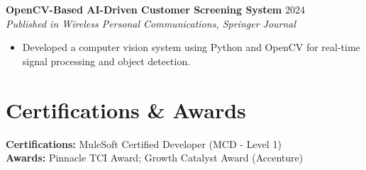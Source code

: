 \documentclass[letterpaper,10pt]{article}
\begin{document}
\textbf{OpenCV-Based AI-Driven Customer Screening System} \hfill 2024 \\
\textit{Published in Wireless Personal Communications, Springer Journal}
\begin{itemize}[leftmargin=*,noitemsep,topsep=-3pt]
    \item Developed a computer vision system using Python and OpenCV for real-time signal processing and object detection.
\end{itemize}

\section*{Certifications \& Awards}
\textbf{Certifications:} MuleSoft Certified Developer (MCD - Level 1) \\
\textbf{Awards:} Pinnacle TCI Award; Growth Catalyst Award (Accenture)
\end{document}
